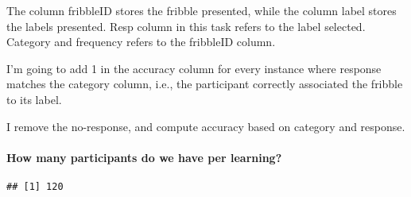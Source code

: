 \documentclass[
]{article}
\newenvironment{Shaded}{\begin{snugshade}}{\end{snugshade}}
\newcommand{\KeywordTok}[1]{\textcolor[rgb]{0.13,0.29,0.53}{\textbf{#1}}}
\newcommand{\NormalTok}[1]{#1}
\newcommand{\OperatorTok}[1]{\textcolor[rgb]{0.81,0.36,0.00}{\textbf{#1}}}
\newcommand{\StringTok}[1]{\textcolor[rgb]{0.31,0.60,0.02}{#1}}
\begin{document}
The column fribbleID stores the fribble presented, while the column
label stores the labels presented. Resp column in this task refers to
the label selected. Category and frequency refers to the fribbleID
column.

I'm going to add 1 in the accuracy column for every instance where
response matches the category column, i.e., the participant correctly
associated the fribble to its label.

I remove the no-response, and compute accuracy based on category and
response.

\hypertarget{how-many-participants-do-we-have-per-learning}{%
\paragraph{How many participants do we have per
learning?}\label{how-many-participants-do-we-have-per-learning}}

\begin{Shaded}
\end{Shaded}

\begin{verbatim}
## [1] 120
\end{verbatim}

\begin{Shaded}
\end{Shaded}
\end{document}
